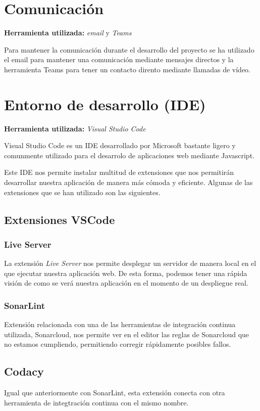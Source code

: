 \section{Comunicación}
\textbf{Herramienta utilizada: } \emph{email} y \emph{Teams}

Para mantener la comunicación durante el desarrollo del proyecto se ha utilizado el email para mantener una comunicación mediante mensajes directos y la herramienta Teams para tener un contacto dirento mediante llamadas de vídeo.

\section{Entorno de desarrollo (IDE)}
\textbf{Herramienta utilizada: }\emph{Visual Studio Code}

Visual Studio Code es un IDE desarrollado por Microsoft bastante ligero y comunmente utilizado para el desarrolo de aplicaciones web mediante Javascript. 

Este IDE nos permite instalar multitud de extensiones que nos permitirán desarrollar nuestra aplicación de manera más cómoda y eficiente. Algunas de las extensiones que se han utilizado son las siguientes.
\subsection{Extensiones VSCode}
\subsubsection{Live Server}
La extensión \emph{Live Server} nos permite desplegar un servidor de manera local en el que ejecutar nuestra aplicación web. De esta forma, podemos tener una rápida visión de como se verá nuestra aplicación en el momento de un despliegue real.

\subsubsection{SonarLint}
Extensión relacionada con una de las herramientas de integración continua utilizada, Sonarcloud, nos permite ver en el editor las reglas de Sonarcloud que no estamos cumpliendo, permitiendo corregir rápidamente posibles fallos.

\subsection{Codacy}
Igual que anteriormente con SonarLint, esta extensión conecta con otra herramienta de integtración continua con el mismo nombre.

